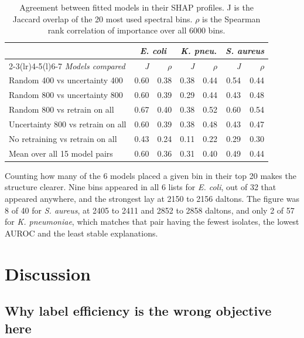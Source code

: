 \documentclass[conference,a4paper]{IEEEtran}
\begin{document}
\begin{table}[!t]
\caption{Agreement between fitted models in their SHAP profiles. J is the Jaccard overlap of the 20 most used spectral bins. $\rho$ is the Spearman rank correlation of importance over all 6000 bins.}
\label{tab:shap}
\centering\footnotesize
\begin{tabular}{@{}lrrrrrr@{}}
\toprule
 & \multicolumn{2}{c}{\textit{E. coli}} & \multicolumn{2}{c}{\textit{K. pneu.}} & \multicolumn{2}{c}{\textit{S. aureus}} \\
\cmidrule(lr){2-3}\cmidrule(lr){4-5}\cmidrule(l){6-7}
\textit{Models compared} & \textit{J} & $\rho$ & \textit{J} & $\rho$ & \textit{J} & $\rho$ \\
\midrule
Random 400 vs uncertainty 400 & 0.60 & 0.38 & 0.38 & 0.44 & 0.54 & 0.44 \\
Random 800 vs uncertainty 800 & 0.60 & 0.39 & 0.29 & 0.44 & 0.43 & 0.48 \\
\midrule
Random 800 vs retrain on all & 0.67 & 0.40 & 0.38 & 0.52 & 0.60 & 0.54 \\
Uncertainty 800 vs retrain on all & 0.60 & 0.39 & 0.38 & 0.48 & 0.43 & 0.47 \\
\midrule
No retraining vs retrain on all & 0.43 & 0.24 & 0.11 & 0.22 & 0.29 & 0.30 \\
Mean over all 15 model pairs & 0.60 & 0.36 & 0.31 & 0.40 & 0.49 & 0.44 \\
\bottomrule
\end{tabular}
\end{table}

Counting how many of the 6 models placed a given bin in their top 20 makes the structure clearer. Nine bins appeared in all 6 lists for \textit{E. coli}, out of 32 that appeared anywhere, and the strongest lay at 2150 to 2156 daltons. The figure was 8 of 40 for \textit{S. aureus}, at 2405 to 2411 and 2852 to 2858 daltons, and only 2 of 57 for \textit{K. pneumoniae}, which matches that pair having the fewest isolates, the lowest AUROC and the least stable explanations.

\section{Discussion}

\subsection{Why label efficiency is the wrong objective here}
\end{document}
